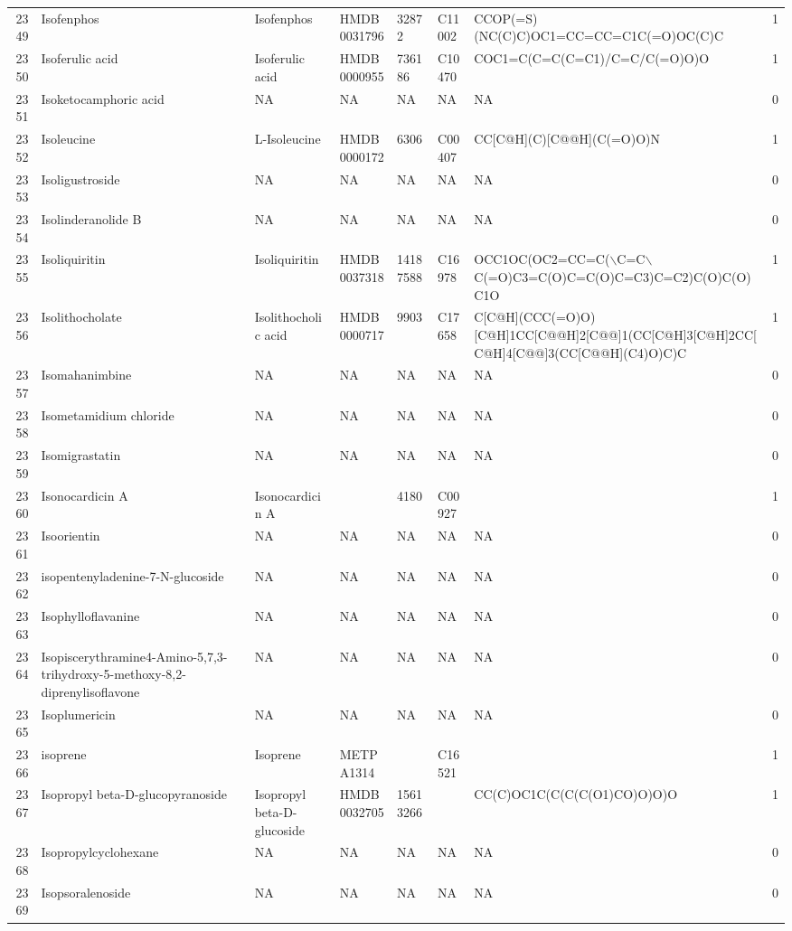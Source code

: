 \documentclass[a4paper]{article}
\begin{document}
\begin{longtable}{rlllllll}
  2349 & Isofenphos & Isofenphos & HMDB0031796 & 32872 & C11002 & CCOP(=S)(NC(C)C)OC1=CC=CC=C1C(=O)OC(C)C & 1 \\ 
  2350 & Isoferulic acid & Isoferulic acid & HMDB0000955 & 736186 & C10470 & COC1=C(C=C(C=C1)/C=C/C(=O)O)O & 1 \\ 
  2351 & Isoketocamphoric acid & NA & NA & NA & NA & NA & 0 \\ 
  2352 & Isoleucine & L-Isoleucine & HMDB0000172 & 6306 & C00407 & CC[C@H](C)[C@@H](C(=O)O)N & 1 \\ 
  2353 & Isoligustroside & NA & NA & NA & NA & NA & 0 \\ 
  2354 & Isolinderanolide B & NA & NA & NA & NA & NA & 0 \\ 
  2355 & Isoliquiritin & Isoliquiritin & HMDB0037318 & 14187588 & C16978 & OCC1OC(OC2=CC=C($\backslash$C=C$\backslash$C(=O)C3=C(O)C=C(O)C=C3)C=C2)C(O)C(O)C1O & 1 \\ 
  2356 & Isolithocholate & Isolithocholic acid & HMDB0000717 & 9903 & C17658 & C[C@H](CCC(=O)O)[C@H]1CC[C@@H]2[C@@]1(CC[C@H]3[C@H]2CC[C@H]4[C@@]3(CC[C@@H](C4)O)C)C & 1 \\ 
  2357 & Isomahanimbine & NA & NA & NA & NA & NA & 0 \\ 
  2358 & Isometamidium chloride & NA & NA & NA & NA & NA & 0 \\ 
  2359 & Isomigrastatin & NA & NA & NA & NA & NA & 0 \\ 
  2360 & Isonocardicin A & Isonocardicin A &  & 4180 & C00927 &  & 1 \\ 
  2361 & Isoorientin & NA & NA & NA & NA & NA & 0 \\ 
  2362 & isopentenyladenine-7-N-glucoside & NA & NA & NA & NA & NA & 0 \\ 
  2363 & Isophylloflavanine & NA & NA & NA & NA & NA & 0 \\ 
  2364 & Isopiscerythramine4-Amino-5,7,3-trihydroxy-5-methoxy-8,2-diprenylisoflavone & NA & NA & NA & NA & NA & 0 \\ 
  2365 & Isoplumericin & NA & NA & NA & NA & NA & 0 \\ 
  2366 & isoprene & Isoprene & METPA1314 &  & C16521 &  & 1 \\ 
  2367 & Isopropyl beta-D-glucopyranoside & Isopropyl beta-D-glucoside & HMDB0032705 & 15613266 &  & CC(C)OC1C(C(C(C(O1)CO)O)O)O & 1 \\ 
  2368 & Isopropylcyclohexane & NA & NA & NA & NA & NA & 0 \\ 
  2369 & Isopsoralenoside & NA & NA & NA & NA & NA & 0 \\ 

\end{longtable}
\end{document}
